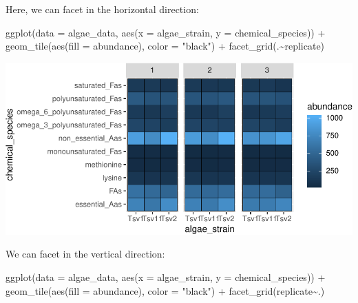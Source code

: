 \documentclass[
]{krantz}
\newenvironment{Shaded}{\begin{snugshade}}{\end{snugshade}}
\newcommand{\AttributeTok}[1]{\textcolor[rgb]{0.77,0.63,0.00}{#1}}
\newcommand{\FunctionTok}[1]{\textcolor[rgb]{0.00,0.00,0.00}{#1}}
\newcommand{\NormalTok}[1]{#1}
\newcommand{\SpecialCharTok}[1]{\textcolor[rgb]{0.00,0.00,0.00}{#1}}
\newcommand{\StringTok}[1]{\textcolor[rgb]{0.31,0.60,0.02}{#1}}
\begin{document}
Here, we can facet in the horizontal direction:

\begin{Shaded}
\begin{Highlighting}[]
\FunctionTok{ggplot}\NormalTok{(}\AttributeTok{data =}\NormalTok{ algae\_data, }\FunctionTok{aes}\NormalTok{(}\AttributeTok{x =}\NormalTok{ algae\_strain, }\AttributeTok{y =}\NormalTok{ chemical\_species)) }\SpecialCharTok{+} 
  \FunctionTok{geom\_tile}\NormalTok{(}\FunctionTok{aes}\NormalTok{(}\AttributeTok{fill =}\NormalTok{ abundance), }\AttributeTok{color =} \StringTok{"black"}\NormalTok{) }\SpecialCharTok{+} 
  \FunctionTok{facet\_grid}\NormalTok{(.}\SpecialCharTok{\textasciitilde{}}\NormalTok{replicate)}
\end{Highlighting}
\end{Shaded}

\begin{center}\includegraphics[width=0.8\linewidth]{index_files/figure-latex/unnamed-chunk-57-1} \end{center}

We can facet in the vertical direction:

\begin{Shaded}
\begin{Highlighting}[]
\FunctionTok{ggplot}\NormalTok{(}\AttributeTok{data =}\NormalTok{ algae\_data, }\FunctionTok{aes}\NormalTok{(}\AttributeTok{x =}\NormalTok{ algae\_strain, }\AttributeTok{y =}\NormalTok{ chemical\_species)) }\SpecialCharTok{+} 
  \FunctionTok{geom\_tile}\NormalTok{(}\FunctionTok{aes}\NormalTok{(}\AttributeTok{fill =}\NormalTok{ abundance), }\AttributeTok{color =} \StringTok{"black"}\NormalTok{) }\SpecialCharTok{+} 
  \FunctionTok{facet\_grid}\NormalTok{(replicate}\SpecialCharTok{\textasciitilde{}}\NormalTok{.)}
\end{Highlighting}
\end{Shaded}
\end{document}
